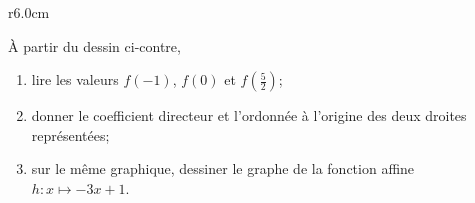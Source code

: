 
\begin{exercice}\label{exosmath-0520}


\begin{wrapfigure}{r}{6.0cm}
   \vspace{-2cm}        %
   \centering
   
\end{wrapfigure}

À partir du dessin ci-contre,
\begin{enumerate}
    \item
        lire les valeurs \( f(-1)\), \( f(0)\) et \( f(\frac{ 5 }{2})\);
    \item
        donner le coefficient directeur et l'ordonnée à l'origine des deux droites représentées;
    \item
       sur le même graphique, dessiner le graphe de la fonction affine \( h\colon x\mapsto -3x+1\).
\end{enumerate}

\end{exercice}
